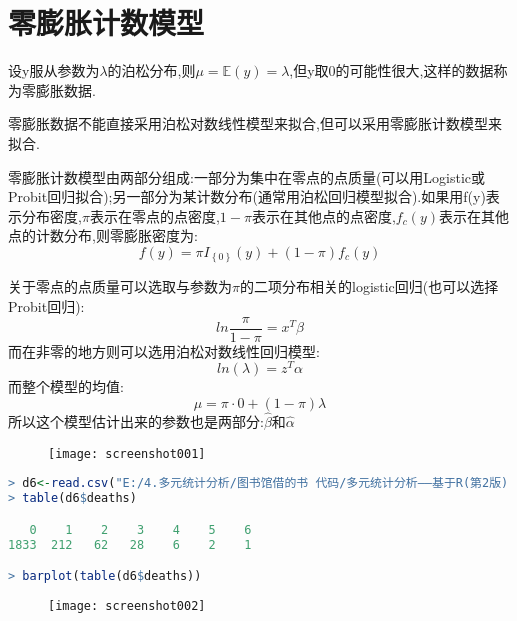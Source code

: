 \documentclass[11pt,a4paper,oneside]{book}
\begin{document}
\section{零膨胀计数模型}
设y服从参数为$ \lambda $的泊松分布,则$ \mu=\mathbb{E}(y)=\lambda $,但y取0的可能性很大,这样的数据称为零膨胀数据.

零膨胀数据不能直接采用泊松对数线性模型来拟合,但可以采用零膨胀计数模型来拟合.

零膨胀计数模型由两部分组成:一部分为集中在零点的点质量(可以用Logistic或Probit回归拟合);另一部分为某计数分布(通常用泊松回归模型拟合).如果用f(y)表示分布密度,$ \pi $表示在零点的点密度,$ 1-\pi $表示在其他点的点密度,$ f_c(y) $表示在其他点的计数分布,则零膨胀密度为:
\[f(y)=\pi I_{\left\lbrace 0\right\rbrace }(y)+(1-\pi)f_c(y)\]

关于零点的点质量可以选取与参数为$ \pi $的二项分布相关的logistic回归(也可以选择Probit回归):
\[ln\frac{\pi}{1-\pi}=x^T\beta\]
而在非零的地方则可以选用泊松对数线性回归模型:
\[ln(\lambda)=z^T\alpha\]
而整个模型的均值:
\[\mu=\pi\cdot0+(1-\pi)\lambda\]
所以这个模型估计出来的参数也是两部分:$ \hat{\beta} $和$ \hat{\alpha} $
\begin{figure}[H]
	\centering
	\texttt{[image: screenshot001]}
\end{figure}
\begin{lstlisting}[language=r]
> d6<-read.csv("E:/4.多元统计分析/图书馆借的书 代码/多元统计分析——基于R(第2版) R-data/eg3.4.csv",header=TRUE)
> table(d6$deaths)

   0    1    2    3    4    5    6 
1833  212   62   28    6    2    1 

> barplot(table(d6$deaths))
\end{lstlisting}
\begin{figure}[H]
	\centering
	\texttt{[image: screenshot002]}
\end{figure}
\end{document}
